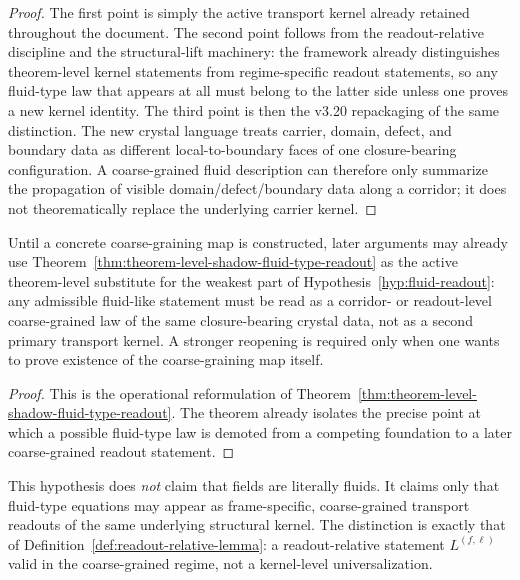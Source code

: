 \begin{proof}
The first point is simply the active transport kernel already retained throughout the document. The second point follows from the readout-relative discipline and the structural-lift machinery: the framework already distinguishes theorem-level kernel statements from regime-specific readout statements, so any fluid-type law that appears at all must belong to the latter side unless one proves a new kernel identity. The third point is then the v3.20 repackaging of the same distinction. The new crystal language treats carrier, domain, defect, and boundary data as different local-to-boundary faces of one closure-bearing configuration. A coarse-grained fluid description can therefore only summarize the propagation of visible domain/defect/boundary data along a corridor; it does not theorematically replace the underlying carrier kernel.
\end{proof}

\begin{corollary}
\label{cor:operational-reading-hypothesis-76-crystal-language}
Until a concrete coarse-graining map is constructed, later arguments may already use Theorem~\ref{thm:theorem-level-shadow-fluid-type-readout} as the active theorem-level substitute for the weakest part of Hypothesis~\ref{hyp:fluid-readout}: any admissible fluid-like statement must be read as a corridor- or readout-level coarse-grained law of the same closure-bearing crystal data, not as a second primary transport kernel. A stronger reopening is required only when one wants to prove existence of the coarse-graining map itself.
\end{corollary}

\begin{proof}
This is the operational reformulation of Theorem~\ref{thm:theorem-level-shadow-fluid-type-readout}. The theorem already isolates the precise point at which a possible fluid-type law is demoted from a competing foundation to a later coarse-grained readout statement.
\end{proof}


\begin{remark}
This hypothesis does \emph{not} claim that fields are literally fluids.
It claims only that fluid-type equations may appear as frame-specific,
coarse-grained transport readouts of the same underlying structural
kernel. The distinction is exactly that of
Definition~\ref{def:readout-relative-lemma}: a readout-relative statement
$L^{(f,\ell)}$ valid in the coarse-grained regime, not a kernel-level
universalization.
\end{remark}

